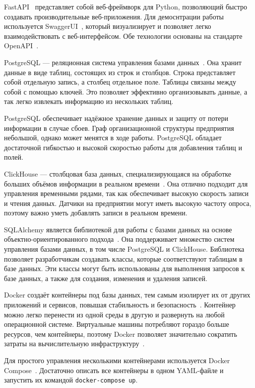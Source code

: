 FastAPI~\cite{FastAPI} представляет собой веб-фреймворк для Python, позволяющий быстро создавать производительные веб-приложения. Для демоснтрации работы используется SwaggerUI~\cite{swaggerui}, который визуализирует и позволяет легко взаимодействовать с веб-интерфейсом. Обе технологии основаны на стандарте OpenAPI~\cite{OpenAPI}.

PostgreSQL --- реляционная система управления базами данных~\cite{postgresql}. Она хранит данные в виде таблиц, состоящих из строк и столбцов. Строка представляет собой отдельную запись, а столбец отдельное поле. Таблицы связаны между собой с помощью ключей. Это позволяет эффективно организовывать данные, а так легко извлекать информацию из нескольких таблиц.

PostgreSQL обеспечивает надёжное хранение данных и защиту от потери информации в случае сбоев. Граф организационной структуры предприятия небольшой, однако может менятся в ходе работы. PostgreSQL обладает достаточной гибкостью и высокой скоростью работы для добавления таблиц и полей.

ClickHouse --- столбцовая база данных, специализирующаяся на обработке больших объёмов информации в реальном времени~\cite{clickhouse}. Она отлично подходит для управления временными рядами, так как обеспечивает высокую скорость записи и чтения данных. Датчики на предприятии могут иметь высокую частоту опроса, поэтому важно уметь добавлять записи в реальном времени.

SQLAlchemy является библиотекой для работы с базами данных на основе объектно-ориентированного подхода~\cite{SQLAlchemy}. Она поддерживает множество систем управления базами данных, в том числе PostgreSQL и ClickHouse. Библиотека позволяет разработчикам создавать классы, которые соответствуют таблицам в базе данных. Эти классы могут быть использованы для выполнения запросов к базе данных, а также для создания, изменения и удаления записей.

Docker создаёт контейнеры под базы данных, тем самым изолирует их от других приложений и сервисов, повышая стабильность и безопасность~\cite{Docker}. Контейнер можно легко перенести из одной среды в другую и развернуть на любой операционной системе. Виртуальные машины потребляют гораздо больше ресурсов, чем контейнеры, поэтому Docker позволяет значительно сократить затраты на вычислительную инфраструктуру~\cite{Habr-VM}.

Для простого управления несколькими контейнерами используется Docker Compose~\cite{Docker-Compose}. Достаточно описать все контейнеры в одном YAML-файле и запустить их командой \texttt{docker-compose up}.

